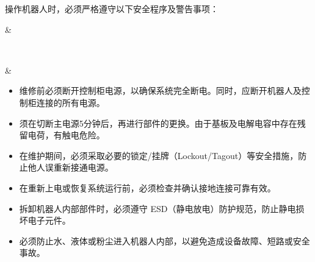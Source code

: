 \documentclass[a4paper,11pt,english,openany,oneside]{sphinxmanual}
\renewcommand{\sphinxstyletheadfamily}{
\color{white}\bfseries
}
\begin{document}
\sphinxAtStartPar
操作机器人时，必须严格遵守以下安全程序及警告事项：


\begin{savenotes}\sphinxattablestart
\sphinxthistablewithglobalstyle
\centering
{}
\sphinxthecaptionisattop
{}\label{\detokenize{_u5b89_u5168_u89c4_u8303:id7}}
\sphinxaftertopcaption
\begin{tabular}[t]{}
\sphinxtoprule
\begin{varwidth}[t]{}
\sphinxstyletheadfamily \sphinxAtStartPar
{}
\sphinxbeforeendvarwidth
\end{varwidth}%
&\begin{varwidth}[t]{}
\sphinxstyletheadfamily \sphinxAtStartPar
{}
\sphinxbeforeendvarwidth
\end{varwidth}%
\\
\sphinxmidrule
\sphinxtableatstartofbodyhook\begin{varwidth}[t]{}

\noindent{}
\sphinxbeforeendvarwidth
\end{varwidth}%
&\begin{varwidth}[t]{}
\sphinxAtStartPar
{}
\begin{itemize}
\item {} 
\sphinxAtStartPar
维修前必须断开控制柜电源，以确保系统完全断电。同时，应断开机器人及控制柜连接的所有电源。

\item {} 
\sphinxAtStartPar
须在切断主电源5分钟后，再进行部件的更换。由于基板及电解电容中存在残留电荷，有触电危险。

\item {} 
\sphinxAtStartPar
在维护期间，必须采取必要的锁定/挂牌（Lockout/Tagout）等安全措施，防止他人误重新接通电源。

\item {} 
\sphinxAtStartPar
在重新上电或恢复系统运行前，必须检查并确认接地连接可靠有效。

\item {} 
\sphinxAtStartPar
拆卸机器人内部部件时，必须遵守 ESD（静电放电）防护规范，防止静电损坏电子元件。

\item {} 
\sphinxAtStartPar
必须防止水、液体或粉尘进入机器人内部，以避免造成设备故障、短路或安全事故。


\end{itemize}
\end{varwidth}
\end{tabular}
\end{savenotes}
\end{document}
